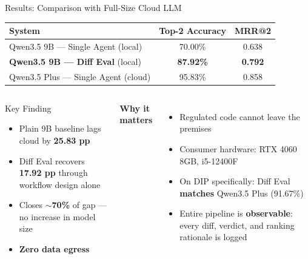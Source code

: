 \documentclass[aspectratio=169,10pt]{beamer}
\begin{document}
\begin{frame}{Results: Comparison with Full-Size Cloud LLM}
  \vspace{0.15cm}
  \begin{center}
    \small
    \begin{tabular}{@{}lcc@{}}
      \toprule
      \textbf{System} & \textbf{Top-2 Accuracy} & \textbf{MRR@2} \\
      \midrule
      Qwen3.5 9B — Single Agent \footnotesize(local)       & 70.00\% & 0.638 \\
      \textbf{Qwen3.5 9B — Diff Eval} \footnotesize(local) & \textbf{87.92\%} & \textbf{0.792} \\
      \midrule
      Qwen3.5 Plus — Single Agent \footnotesize(cloud)     & 95.83\% & 0.858 \\
      \bottomrule
    \end{tabular}
  \end{center}
  \vspace{0.25cm}
  \begin{columns}[T]
      \begin{block}{Key Finding}
        \begin{itemize}\small
          \item Plain 9B baseline lags cloud by \textbf{25.83 pp}
          \item Diff Eval recovers \textbf{17.92 pp} through workflow design alone
          \item Closes \textbf{$\sim$70\%} of gap — no increase in model size
          \item \textbf{Zero data egress}
        \end{itemize}
      \end{block}
      \textbf{Why it matters}
      \begin{itemize}\small
        \item Regulated code cannot leave the premises
        \item Consumer hardware: RTX 4060 8GB, i5-12400F
        \item On DIP specifically: Diff Eval \textbf{matches} Qwen3.5 Plus (91.67\%)
        \item Entire pipeline is \textbf{observable}: every diff, verdict, and ranking rationale is logged
      \end{itemize}
  \end{columns}
\end{frame}
\end{document}

